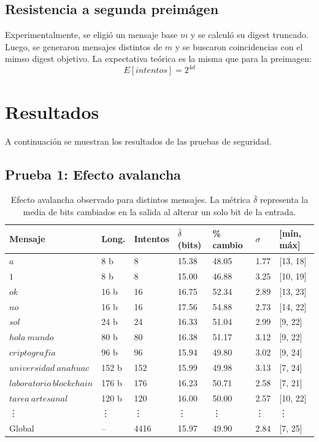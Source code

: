 \documentclass[11pt, letterpaper]{article}
\begin{document}
\subsection{Resistencia a segunda preimágen}
Experimentalmente, se eligió un mensaje base $m$ y se calculó su digest truncado. Luego, se generaron mensajes distintos de $m$ y se buscaron coincidencias con el mimso digest objetivo. La expectativa teórica es la misma que para la preimagen:
\begin{equation}
    E[intentos] = 2^{4d}
\end{equation}

\section{Resultados}
A continuación se muestran los resultados de las pruebas de seguridad.
\subsection{Prueba 1: Efecto avalancha}

\begin{table}[H]
\centering
\small
\renewcommand{\arraystretch}{1.2}
\begin{tabularx}{\textwidth}{lXXXXXX}
\toprule
Mensaje & Long. & Intentos & $\bar{\delta}$ (bits) & \% cambio & $\sigma$ & [mín, máx] \\
\midrule
$a$ & 8 b & 8 & 15.38 & 48.05 & 1.77 & [13, 18] \\
$1$ & 8 b & 8 & 15.00 & 46.88 & 3.25 & [10, 19] \\
$ok$ & 16 b & 16 & 16.75 & 52.34 & 2.89 & [13, 23] \\
$no$ & 16 b & 16 & 17.56 & 54.88 & 2.73 & [14, 22] \\
$sol$ & 24 b & 24 & 16.33 & 51.04 & 2.99 & [9, 22] \\
$hola\ mundo$ & 80 b & 80 & 16.38 & 51.17 & 3.12 & [9, 22] \\
$criptografia$ & 96 b & 96 & 15.94 & 49.80 & 3.02 & [9, 24] \\
$universidad\ anahuac$ & 152 b & 152 & 15.99 & 49.98 & 3.13 & [7, 24] \\
$laboratorio\ blockchain$ & 176 b & 176 & 16.23 & 50.71 & 2.58 & [7, 21] \\
$tarea\ artesanal$ & 120 b & 120 & 16.00 & 50.00 & 2.57 & [10, 22] \\
\vdots & \vdots & \vdots & \vdots & \vdots & \vdots & \vdots \\
\midrule
Global & -- & 4416 & 15.97 & 49.90 & 2.84 & [7, 25] \\
\bottomrule
\end{tabularx}
\caption{Efecto avalancha observado para distintos mensajes. La métrica $\bar{\delta}$ representa la media de bits cambiados en la salida al alterar un solo bit de la entrada.}
\end{table}
\end{document}
